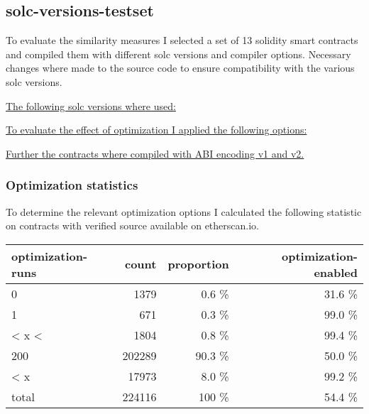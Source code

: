 \documentclass[../main.tex]{subfiles}
\begin{document}
\subsection{solc-versions-testset \cite{solc-versions-testset}}
To evaluate the similarity measures I selected a set of 13 solidity smart contracts and compiled
them with different solc versions and compiler options.
Necessary changes where made to the source code to ensure compatibility with the various solc
versions.

\underline{The following solc versions where used:}
\begin{ol}
  \item {}
  \item {}
  \item {}
  \item {}
\end{ol}
\underline{To evaluate the effect of optimization I applied the following options:}
\begin{ol}
  \item {}
  \item {}
  \item {}
  \item {}
\end{ol}
\underline{Further the contracts where compiled with ABI encoding v1 and v2.}

\subsubsection{Optimization statistics}

To determine the relevant optimization options I calculated the following statistic on contracts with verified source available on etherscan.io.

\begin{tabular}{lrrr}
  optimization-runs & count  & proportion & optimization-enabled \\
  \hline
  0                 & 1379   & 0.6 \%     & 31.6 \%              \\
  1                 & 671    & 0.3 \%     & 99.0 \%              \\
  < x <             & 1804   & 0.8 \%     & 99.4 \%              \\
  200               & 202289 & 90.3 \%    & 50.0 \%              \\
  < x               & 17973  & 8.0 \%     & 99.2 \%              \\
  \hline
  total             & 224116 & 100 \%     & 54.4 \%
\end{tabular}
\end{document}
